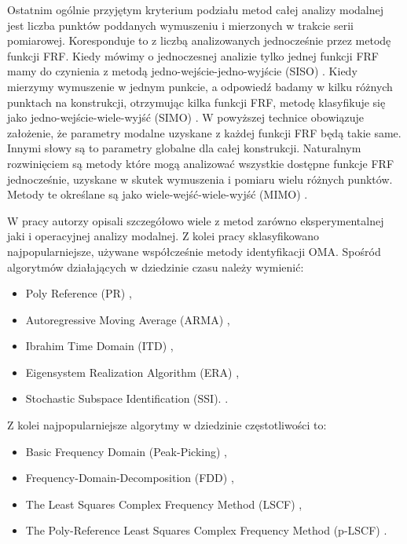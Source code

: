 Ostatnim ogólnie przyjętym kryterium podziału metod całej analizy modalnej jest liczba punktów poddanych wymuszeniu i mierzonych w trakcie serii pomiarowej. Koresponduje to z liczbą analizowanych jednocześnie przez metodę funkcji FRF. Kiedy mówimy o jednoczesnej analizie tylko jednej funkcji FRF mamy do czynienia z metodą jedno-wejście-jedno-wyjście (SISO) . Kiedy mierzymy wymuszenie w jednym punkcie, a odpowiedź badamy w kilku różnych punktach na konstrukcji, otrzymując kilka funkcji FRF, metodę klasyfikuje się jako jedno-wejście-wiele-wyjść (SIMO) . W powyższej technice obowiązuje założenie, że parametry modalne uzyskane z każdej funkcji FRF będą takie same. Innymi słowy są to parametry globalne dla całej konstrukcji. Naturalnym rozwinięciem są metody które mogą analizować wszystkie dostępne funkcje FRF jednocześnie, uzyskane w skutek wymuszenia i pomiaru wielu różnych punktów. Metody te określane są jako wiele-wejść-wiele-wyjść (MIMO) .

W pracy \cite{Maia1997} autorzy opisali szczegółowo wiele z metod zarówno eksperymentalnej jaki i operacyjnej analizy modalnej. Z kolei pracy \cite{Brincker2015} sklasyfikowano najpopularniejsze, używane współcześnie metody identyfikacji OMA. Spośród algorytmów działających w dziedzinie czasu należy wymienić:
\begin{itemize}
	\item Poly Reference (PR) \parencite{Norton2009,Vold1982},
	\item Autoregressive Moving Average (ARMA) \parencite{Shi1987,Huang2000,Giorcelli1994},
	\item Ibrahim Time Domain (ITD) \parencite{Ibrahim1983,Pappa1985a},
	\item Eigensystem Realization Algorithm (ERA) \parencite{Juang1985,Pappa1985,Juang1986a},
	\item Stochastic Subspace Identification (SSI). \parencite{VanOverschee1996,Peeters1999a,Peeters2000}. 
\end{itemize}
Z kolei najpopularniejsze algorytmy w dziedzinie częstotliwości to:
\begin{itemize}
	\item Basic Frequency Domain (Peak-Picking) \parencite{Felber1994},
	\item Frequency-Domain-Decomposition (FDD) \parencite{Brincker2000,Brincker2001a,Brincker2001b},
	\item The Least Squares Complex Frequency Method (LSCF) \parencite{Verboven2005},
	\item The Poly-Reference Least Squares Complex Frequency Method (p-LSCF) \parencite{Peeters2005}.
\end{itemize}




